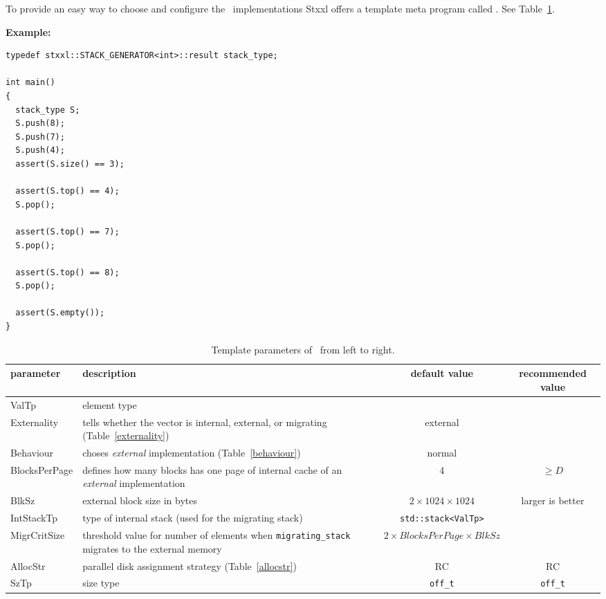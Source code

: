 \documentclass[twoside]{book}
\newcommand{\stxxl}{{\sc Stxxl} }
\begin{document}
To provide an easy way to choose and configure the \xstack\
implementations \stxxl offers a template meta program called
\xstackg. See Table~\ref{stackparam}.

{\bf Example:}
\begin{lstlisting}
typedef stxxl::STACK_GENERATOR<int>::result stack_type;

int main()
{
  stack_type S;
  S.push(8);
  S.push(7);
  S.push(4);
  assert(S.size() == 3);

  assert(S.top() == 4);
  S.pop();

  assert(S.top() == 7);
  S.pop();

  assert(S.top() == 8);
  S.pop();

  assert(S.empty());
}

\end{lstlisting}

\begin{table}[h]
\begin{center}
\caption{Template parameters of \xstackg\ from left to right.}
\label{stackparam}
\begin{tabular}{|l|p{4.5cm}|c|c|}
\hline
parameter& description  & default value & recommended value \\
\hline\hline
ValTp       & element type & & \\
\hline
Externality & tells whether the vector is internal, external, or
migrating (Table~\ref{externality}) & external & \\
\hline
Behaviour & choses \emph{external} implementation
(Table~\ref{behaviour})& normal & \\ 
\hline
BlocksPerPage & defines how many blocks has one page of internal cache
of an \emph{external} implementation & 4 &  $\geq D$ \\
\hline
BlkSz & external block size in bytes &  $2\times 1024\times 1024$ &
larger is better\\
\hline
IntStackTp & type of internal stack (used for the migrating stack) &  
\texttt{std::stack<ValTp>} &\\
\hline
MigrCritSize & threshold value for number of elements when
\texttt{migrating\_stack} migrates to the external memory & 
$2\times BlocksPerPage\times BlkSz$ & \\
\hline
AllocStr &  parallel disk assignment strategy 
(Table~\ref{allocstr}) & RC & RC \\
\hline
SzTp & size type & \texttt{off\_t} & \texttt{off\_t} \\
\hline
\end{tabular}
\end{center}
\end{table}
\end{document}
